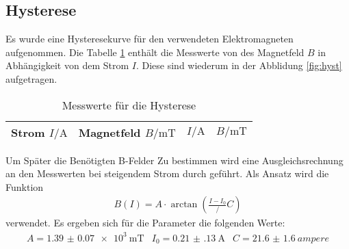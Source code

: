 \subsection{Hysterese}
Es wurde eine Hysteresekurve für den verwendeten Elektromagneten aufgenommen.
Die Tabelle \ref{tab:hyst} enthält die Messwerte von des Magnetfeld $B$
in Abhängigkeit von dem  Strom $I$. Diese sind wiederum
in der Abblidung \ref{fig:hyst} aufgetragen.
\begin{table}
  \centering
  \caption{Messwerte für die Hysterese}
  \label{tab:hyst}
\begin{tabular}{c c c c}
  \toprule
 Strom $I/\si{\ampere}$ & Magnetfeld $B/\si{\milli\tesla}$  & $I/\si{\ampere}$ & $B/\si{\milli\tesla}$ \\
  \midrule
  \bottomrule
\end{tabular}
\end{table}



Um Später die Benötigten B-Felder Zu bestimmen wird eine Ausgleichsrechnung
an den Messwerten bei steigendem Strom durch geführt.
Als Ansatz wird die Funktion
\begin{align}
B(I)=A \cdot \arctan(\frac{I-I_0}/C) \label{eqn:hyst}
\end{align}
verwendet.
Es ergeben sich für die Parameter die folgenden Werte:
\begin{align}
  A=\SI{1.39(7)e3}{\milli\tesla}   & I_0=\SI{0.21(13)}{\ampere}  &  C=\SI{21.6(16)}{ampere}
\end{align}
